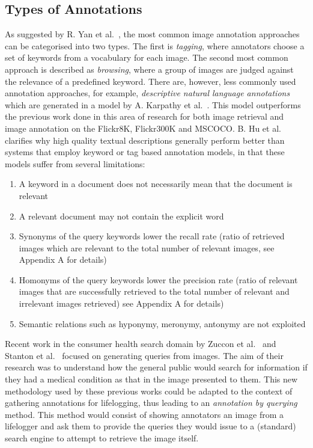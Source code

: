 \documentclass[12pt,a4paper]{article}
\begin{document}
\subsection{Types of Annotations}
As suggested by R. Yan et al.~\cite{yan2008learning}, the most common image annotation approaches can be categorised into two types. The first is \textit{tagging}, where annotators choose a set of keywords from a vocabulary for each image. The second most common approach is described as \textit{browsing}, where a group of images are judged against the relevance of a predefined keyword. There are, however, less commonly used annotation approaches, for example, \textit{descriptive natural language annotations} which are generated in a model by A. Karpathy et al.~\cite{karpathy2015deep}. This model outperforms the previous work done in this area of research for both image retrieval and image annotation on the Flickr8K, Flickr300K and MSCOCO. B. Hu et al.~\cite{hu2003ontology} clarifies why high quality textual descriptions generally perform better than systems that employ keyword or tag based annotation models, in that these models suffer from several limitations:
\begin{enumerate}
    \item A keyword in a document does not necessarily mean that the document is relevant
    \item A relevant document may not contain the explicit word
    \item Synonyms of the query keywords lower the recall rate (ratio of retrieved images which are relevant to the total number of relevant images, see Appendix A for details)
    \item Homonyms of the query keywords lower the precision rate  (ratio of relevant images that are successfully retrieved to the total number of relevant and irrelevant images retrieved) see Appendix A for details)
    \item Semantic relations such as hyponymy, meronymy, antonymy are not exploited
\end{enumerate}

Recent work in the consumer health search domain by Zuccon et al.~\cite{quteprints82599} and Stanton et al.~\cite{stanton2014circumlocution} focused on generating queries from images. The aim of their research was to understand how the general public would search for information if they had a medical condition as that in the image presented to them. This new methodology used by these previous works could be adapted to the context of gathering annotations for lifelogging, thus leading to an \textit{annotation by querying} method. This method would consist of showing annotators an image from a lifelogger and ask them to provide the queries they would issue to a (standard) search engine to attempt to retrieve the image itself.
\end{document}
